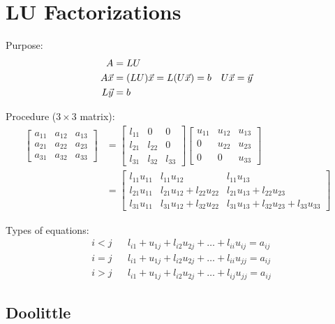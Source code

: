 \section{LU Factorizations}

	Purpose:
	\begin{align}
		A &= LU& \\
		A\vec{x} &= (LU)\vec{x} = L(U\vec{x}) = b& U\vec{x} &= \vec{y}& \notag \\
		L\vec{y} &= b&
	\end{align}

	\noindent Procedure ($3 \times 3$ matrix):
	\begin{align}
		\begin{bmatrix}
			a_{11} & a_{12} & a_{13} \\
			a_{21} & a_{22} & a_{23} \\
			a_{31} & a_{32} & a_{33}
		\end{bmatrix} &=
		\begin{bmatrix}
			l_{11} & 0 & 0 \\
			l_{21} & l_{22} & 0 \\
			l_{31} & l_{32} & l_{33}
		\end{bmatrix}
		\begin{bmatrix}
			u_{11} & u_{12} & u_{13} \\
			0 & u_{22} & u_{23} \\
			0 & 0 & u_{33}
		\end{bmatrix}
		& \\ &=
		\begin{bmatrix}
			l_{11} u_{11} & l_{11} u_{12} & l_{11} u_{13} \\
			l_{21} u_{11} & l_{21} u_{12} + l_{22} u_{22}
				& l_{21} u_{13} + l_{22} u_{23} \\
			l_{31} u_{11} & l_{31} u_{12} + l_{32} u_{22}
				& l_{31} u_{13} + l_{32} u_{23} + l_{33} u_{33}
		\end{bmatrix}
	\end{align}

	\noindent Types of equations:
	\begin{align}
		&i < j& &l_{i1} + u_{1j} + l_{i2} u_{2j} + \dots + l_{ii} u_{ij} = a_{ij}& \\
		&i = j& &l_{i1} + u_{1j} + l_{i2} u_{2j} + \dots + l_{ii} u_{jj} = a_{ij}& \\
		&i > j& &l_{i1} + u_{1j} + l_{i2} u_{2j} + \dots + l_{ij} u_{jj} = a_{ij}&
	\end{align}

	\subsection{Doolittle}

